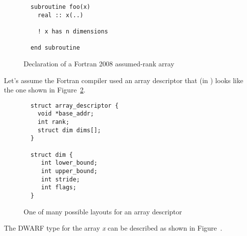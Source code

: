 \begin{figure}[!h]
\begin{lstlisting}
  subroutine foo(x)
    real :: x(..)

    ! x has n dimensions
  
  end subroutine
\end{lstlisting}
\caption{Declaration of a Fortran 2008 assumed-rank array}
\label{fig:assumedrankdecl}
\end{figure}

Let's assume the Fortran compiler used an array descriptor that
(in ) looks
like the one shown in Figure~\ref{fig:arraydesc}.

\begin{figure}[!h]
\begin{lstlisting}
  struct array_descriptor {
    void *base_addr;
    int rank;
    struct dim dims[]; 
  }

  struct dim {
     int lower_bound;
     int upper_bound;
     int stride;
     int flags;
  }
\end{lstlisting}
\caption{One of many possible layouts for an array descriptor}
\label{fig:arraydesc}
\end{figure}

The DWARF type for the array \emph{x} can be described as shown in
Figure~.

